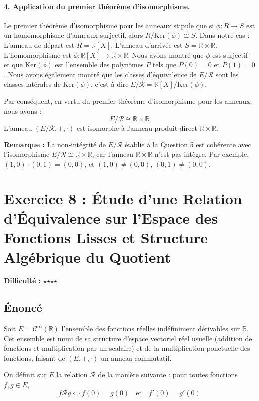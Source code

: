 \documentclass{report}
\begin{document}
\subsubsection*{4. Application du premier théorème d'isomorphisme.}
Le premier théorème d'isomorphisme pour les anneaux stipule que si $\phi: R \to S$ est un homomorphisme d'anneaux surjectif, alors $R/\text{Ker}(\phi) \cong S$.
Dans notre cas :
L'anneau de départ est $R = \mathbb{R}[X]$.
L'anneau d'arrivée est $S = \mathbb{R} \times \mathbb{R}$.
L'homomorphisme est $\phi: \mathbb{R}[X] \to \mathbb{R} \times \mathbb{R}$.
Nous avons montré que $\phi$ est surjectif et que $\text{Ker}(\phi)$ est l'ensemble des polynômes $P$ tels que $P(0)=0$ et $P(1)=0$.
Nous avons également montré que les classes d'équivalence de $E/\mathcal{R}$ sont les classes latérales de $\text{Ker}(\phi)$, c'est-à-dire $E/\mathcal{R} = \mathbb{R}[X]/\text{Ker}(\phi)$.

Par conséquent, en vertu du premier théorème d'isomorphisme pour les anneaux, nous avons :
$$E/\mathcal{R} \cong \mathbb{R} \times \mathbb{R}$$
L'anneau $(E/\mathcal{R}, +, \cdot)$ est isomorphe à l'anneau produit direct $\mathbb{R} \times \mathbb{R}$.

\textbf{Remarque :} La non-intégrité de $E/\mathcal{R}$ établie à la Question 5 est cohérente avec l'isomorphisme $E/\mathcal{R} \cong \mathbb{R} \times \mathbb{R}$, car l'anneau $\mathbb{R} \times \mathbb{R}$ n'est pas intègre. Par exemple, $(1,0) \cdot (0,1) = (0,0)$, et $(1,0) \neq (0,0)$, $(0,1) \neq (0,0)$.
\newpage

\newpage
\chapter*{Exercice 8 : Étude d'une Relation d'Équivalence sur l'Espace des Fonctions Lisses et Structure Algébrique du Quotient}
\textbf{Difficulté :} $\star$$\star$$\star$$\star$

\section*{Énoncé}
Soit $E = \mathcal{C}^\infty(\mathbb{R})$ l'ensemble des fonctions réelles indéfiniment dérivables sur $\mathbb{R}$. Cet ensemble est muni de sa structure d'espace vectoriel réel usuelle (addition de fonctions et multiplication par un scalaire) et de la multiplication ponctuelle des fonctions, faisant de $(E, +, \cdot)$ un anneau commutatif.

On définit sur $E$ la relation $\mathcal{R}$ de la manière suivante : pour toutes fonctions $f, g \in E$,
$$f \mathcal{R} g \iff f(0) = g(0) \quad \text{et} \quad f'(0) = g'(0)$$
\end{document}

